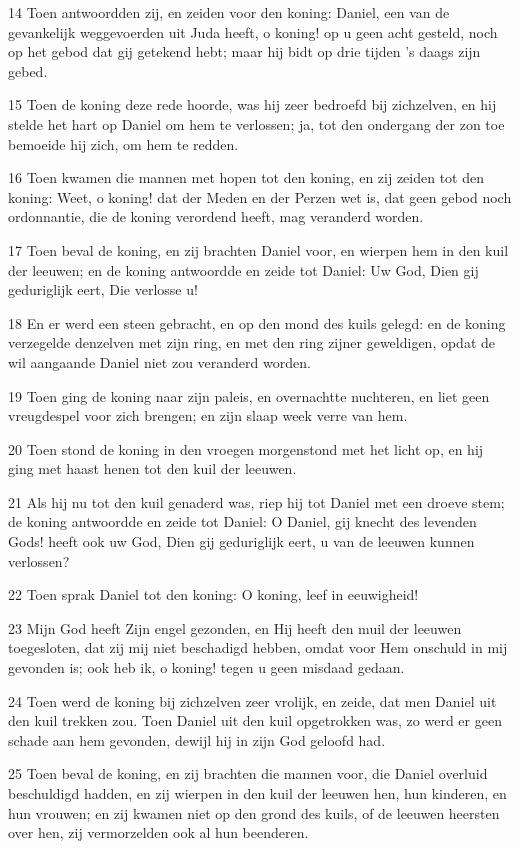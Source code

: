 \par 14 Toen antwoordden zij, en zeiden voor den koning: Daniel, een van de gevankelijk weggevoerden uit Juda heeft, o koning! op u geen acht gesteld, noch op het gebod dat gij getekend hebt; maar hij bidt op drie tijden 's daags zijn gebed.
\par 15 Toen de koning deze rede hoorde, was hij zeer bedroefd bij zichzelven, en hij stelde het hart op Daniel om hem te verlossen; ja, tot den ondergang der zon toe bemoeide hij zich, om hem te redden.
\par 16 Toen kwamen die mannen met hopen tot den koning, en zij zeiden tot den koning: Weet, o koning! dat der Meden en der Perzen wet is, dat geen gebod noch ordonnantie, die de koning verordend heeft, mag veranderd worden.
\par 17 Toen beval de koning, en zij brachten Daniel voor, en wierpen hem in den kuil der leeuwen; en de koning antwoordde en zeide tot Daniel: Uw God, Dien gij geduriglijk eert, Die verlosse u!
\par 18 En er werd een steen gebracht, en op den mond des kuils gelegd: en de koning verzegelde denzelven met zijn ring, en met den ring zijner geweldigen, opdat de wil aangaande Daniel niet zou veranderd worden.
\par 19 Toen ging de koning naar zijn paleis, en overnachtte nuchteren, en liet geen vreugdespel voor zich brengen; en zijn slaap week verre van hem.
\par 20 Toen stond de koning in den vroegen morgenstond met het licht op, en hij ging met haast henen tot den kuil der leeuwen.
\par 21 Als hij nu tot den kuil genaderd was, riep hij tot Daniel met een droeve stem; de koning antwoordde en zeide tot Daniel: O Daniel, gij knecht des levenden Gods! heeft ook uw God, Dien gij geduriglijk eert, u van de leeuwen kunnen verlossen?
\par 22 Toen sprak Daniel tot den koning: O koning, leef in eeuwigheid!
\par 23 Mijn God heeft Zijn engel gezonden, en Hij heeft den muil der leeuwen toegesloten, dat zij mij niet beschadigd hebben, omdat voor Hem onschuld in mij gevonden is; ook heb ik, o koning! tegen u geen misdaad gedaan.
\par 24 Toen werd de koning bij zichzelven zeer vrolijk, en zeide, dat men Daniel uit den kuil trekken zou. Toen Daniel uit den kuil opgetrokken was, zo werd er geen schade aan hem gevonden, dewijl hij in zijn God geloofd had.
\par 25 Toen beval de koning, en zij brachten die mannen voor, die Daniel overluid beschuldigd hadden, en zij wierpen in den kuil der leeuwen hen, hun kinderen, en hun vrouwen; en zij kwamen niet op den grond des kuils, of de leeuwen heersten over hen, zij vermorzelden ook al hun beenderen.
